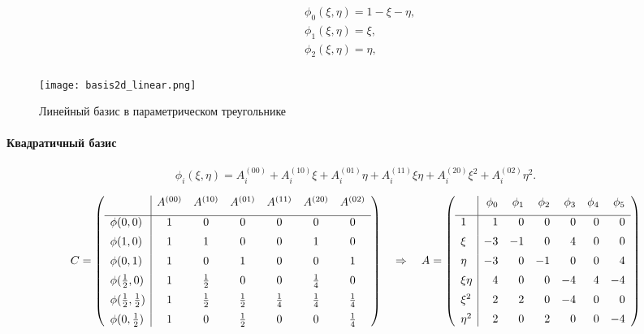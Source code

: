 \begin{equation}
\label{eq:triangle_linear_basis}
\begin{aligned}
&\phi_0(\xi, \eta) = 1 - \xi - \eta, \\
&\phi_1(\xi, \eta) = \xi, \\
&\phi_2(\xi, \eta) = \eta, \\
\end{aligned}
\end{equation}

\begin{figure}[h!]
\centering
\texttt{[image: basis2d\_linear.png]}
\caption{Линейный базис в параметрическом треугольнике}
\label{fig:basis2d_linear}
\end{figure}


\paragraph{Квадратичный базис}
\begin{equation*}
\phi_i(\xi, \eta) = A_i^{(00)} + A_i^{(10)} \xi + A_i^{(01)} \eta + A_i^{(11)} \xi \eta + A_i^{(20)} \xi^2 + A_i^{(02)} \eta^2.
\end{equation*}

\begin{equation*}
C =
\left(
\begin{array}{l|cccccc}
                     & A^{(00)} & A^{(10)}      & A^{(01)}  & A^{(11)}  & A^{(20)}    & A^{(02)}   \\[5pt]
\hline
\phi(0, 0)               & 1 &  0       &  0          &   0      &    0     &   0      \\[5pt]
\phi(1, 0)               & 1 &  1       &  0          &   0      &    1     &   0      \\[5pt]
\phi(0, 1)               & 1 &  0       &  1          &   0      &    0     &   1      \\[5pt]
\phi(\tfrac12, 0)        & 1 & \tfrac12 &  0          &   0      & \tfrac14 &   0      \\[5pt]
\phi(\tfrac12, \tfrac12) & 1 & \tfrac12 &  \tfrac12   & \tfrac14 & \tfrac14 & \tfrac14 \\[5pt]
\phi(0, \tfrac12)        & 1 &  0       &  \tfrac12   &   0      &    0     & \tfrac14 
\end{array}
\right)
\quad\Rightarrow\quad
A = \left(
\begin{array}{l|rrrrrr}
        & \phi_0 & \phi_1 & \phi_2 & \phi_3 & \phi_4 & \phi_5 \\[5pt]
\hline
1       & 1  &  0 & 0 & 0 & 0 & 0\\[5pt]
\xi     & -3 & -1 & 0 & 4 & 0 & 0\\[5pt]
\eta    & -3 & 0 & -1 & 0 & 0 & 4\\[5pt]
\xi\eta & 4 & 0 & 0 & -4 & 4 & -4\\[5pt]
\xi^2   & 2 & 2 & 0 & -4 & 0 & 0 \\[5pt]
\eta^2  & 2 & 0 & 2 & 0 & 0 & -4
\end{array}
\right)
\end{equation*}

